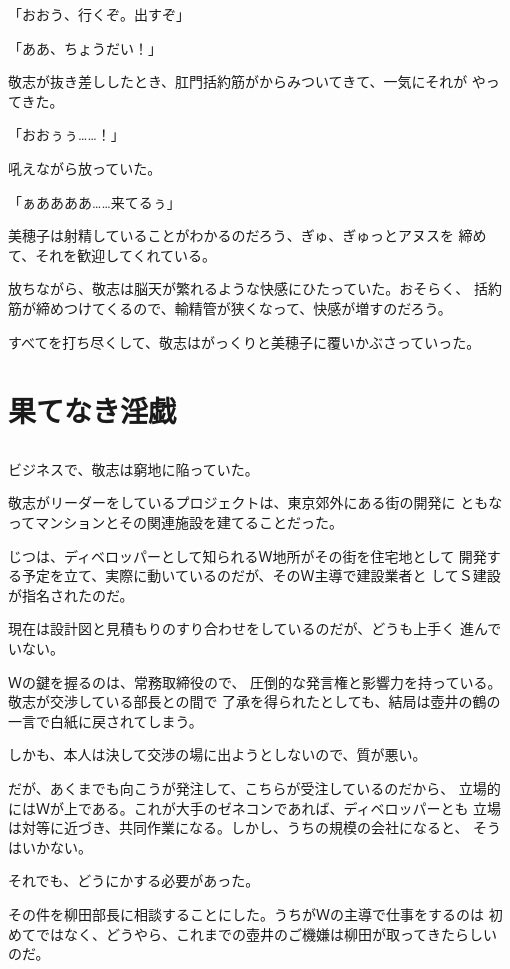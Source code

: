 ﻿\documentclass[
    book,tate,
    line_length=30zw,
    jafontsize=12pt,
    paper=b5j,
    landscape,
    ]{jlreq}
\begin{document}
「おおう、行くぞ。出すぞ」

「ああ、ちょうだい！」

敬志が抜き差ししたとき、肛門括約筋がからみついてきて、一気にそれが
やってきた。

「おおぅぅ……！」

吼えながら放っていた。

「ぁああああ……来てるぅ」

美穂子は射精していることがわかるのだろう、ぎゅ、ぎゅっとアヌスを
締めて、それを歓迎してくれている。

放ちながら、敬志は脳天が繁れるような快感にひたっていた。おそらく、
括約筋が締めつけてくるので、輸精管が狭くなって、快感が増すのだろう。

すべてを打ち尽くして、敬志はがっくりと美穂子に覆いかぶさっていった。

\chapter{果てなき淫戯}

\section*{}

ビジネスで、敬志は窮地に陥っていた。

敬志がリーダーをしているプロジェクトは、東京郊外にある街の開発に
ともなってマンションとその関連施設を建てることだった。

じつは、ディベロッパーとして知られるＷ地所がその街を住宅地として
開発する予定を立て、実際に動いているのだが、そのＷ主導で建設業者と
してＳ建設が指名されたのだ。

現在は設計図と見積もりのすり合わせをしているのだが、どうも上手く
進んでいない。

Ｗの鍵を握るのは、常務取締役ので、
圧倒的な発言権と影響力を持っている。敬志が交渉している部長との間で
了承を得られたとしても、結局は壺井の鶴の一言で白紙に戻されてしまう。

しかも、本人は決して交渉の場に出ようとしないので、質が悪い。

だが、あくまでも向こうが発注して、こちらが受注しているのだから、
立場的にはＷが上である。これが大手のゼネコンであれば、ディベロッパーとも
立場は対等に近づき、共同作業になる。しかし、うちの規模の会社になると、
そうはいかない。

それでも、どうにかする必要があった。

その件を柳田部長に相談することにした。うちがＷの主導で仕事をするのは
初めてではなく、どうやら、これまでの壺井のご機嫌は柳田が取ってきたらしい
のだ。
\end{document}
